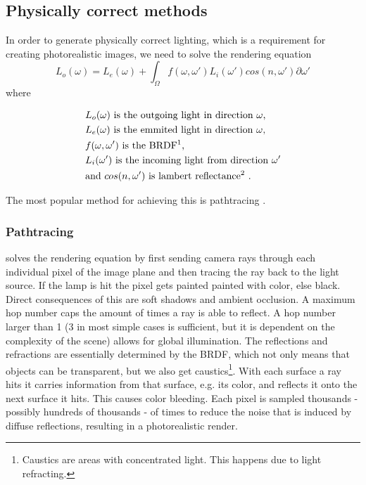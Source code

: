 \documentclass{ACGSeminar}
\begin{document}
	\subsection{Physically correct methods}
	In order to generate physically correct lighting, which is a requirement for creating photorealistic images, we need to solve the rendering equation
	$$ L_o(\omega) = L_e(\omega) + \int_\Omega f(\omega, \omega')L_i(\omega')cos(n, \omega') \partial \omega' $$
	where 
	\begin{center}
		\begin{align*}
			&L_o(\omega) \text{ is the outgoing light in direction } \omega\text{,}\\
			&L_e(\omega) \text{ is the emmited light in direction } \omega\text{,}\\
			&f(\omega, \omega') \text{ is the BRDF\footnotemark} \text{,}\\
			&L_i(\omega') \text{ is the incoming light from direction } \omega'\\
			&\text{and } cos(n, \omega') \text{ is lambert reflectance\footnotemark}  \text{ .}
		\end{align*}
	\end{center}
	\addtocounter{footnote}{-1}
	The most popular method for achieving this is pathtracing \cite{P2PATH}.
	\subsubsection{Pathtracing}
		solves the rendering equation by first sending camera rays through each individual pixel of the image plane and then tracing the ray back to the light source. If the lamp is hit the pixel gets painted painted with color, else black. Direct consequences of this are soft shadows and ambient occlusion. A maximum hop number caps the amount of times a ray is able to reflect. A hop number larger than 1 (3 in most simple cases is sufficient, but it is dependent on the complexity of the scene) allows for global illumination. The reflections and refractions are essentially determined by the BRDF, which not only means that objects can be transparent, but we also get caustics\footnote{Caustics are areas with concentrated light. This happens due to light refracting.}. With each surface a ray hits it carries information from that surface, e.g. its color, and reflects it onto the next surface it hits. This causes color bleeding. Each pixel is sampled thousands - possibly hundreds of thousands - of times to reduce the noise that is induced by diffuse reflections, resulting in a photorealistic render.
\end{document}

